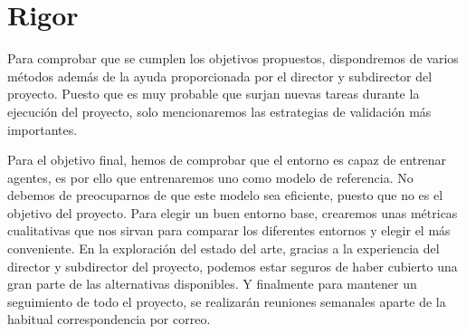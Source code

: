 \section{Rigor}
Para comprobar que se cumplen los objetivos propuestos, dispondremos de varios métodos además de la ayuda proporcionada por el director y subdirector del proyecto. Puesto que es muy probable que surjan nuevas tareas durante la ejecución del proyecto, solo mencionaremos las estrategias de validación más importantes. 

Para el objetivo final, hemos de comprobar que el entorno es capaz de entrenar agentes, es por ello que entrenaremos uno como modelo de referencia. No debemos de preocuparnos de que este modelo sea eficiente, puesto que no es el objetivo del proyecto. Para elegir un buen entorno base, crearemos unas métricas cualitativas que nos sirvan para comparar los diferentes entornos y elegir el más conveniente. En la exploración del estado del arte, gracias a la experiencia del director y subdirector del proyecto, podemos estar seguros de haber cubierto una gran parte de las alternativas disponibles. Y finalmente para mantener un seguimiento de todo el proyecto, se realizarán reuniones semanales aparte de la habitual correspondencia por correo.

 
 
